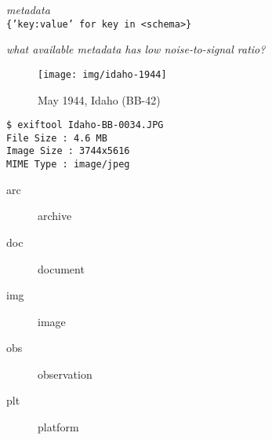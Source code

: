 \documentclass{beamer}
\begin{document}
\begin{frame}[fragile]
  \begin{center}
    \textit{metadata}\\
    \texttt{\{'key:value' for key in <schema>\}}
  \end{center}
    \textit{what available metadata has low noise-to-signal ratio?}

\begin{minipage}[t]{0.5\linewidth}
    \begin{figure}
        \texttt{[image: img/idaho-1944]}
        \caption{
            May 1944, Idaho (BB-42)
        }
    \end{figure}
\end{minipage}
\begin{minipage}[t]{0.45\linewidth}
\hspace{2em}
\begin{verbatim}
$ exiftool Idaho-BB-0034.JPG 
File Size : 4.6 MB
Image Size : 3744x5616
MIME Type : image/jpeg
\end{verbatim}
        \begin{description}
            \item[arc] archive
            \item[doc] document
            \item[img] image
            \item[obs] observation
            \item[plt] platform
        \end{description}
\end{minipage}
\end{frame}
\end{document}
